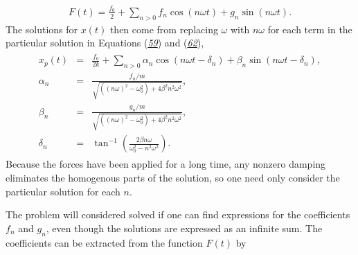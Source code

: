 \documentclass[letterpaper,10pt,english]{sphinxmanual}
\begin{document}
\begin{equation*}
\begin{split}
\begin{equation}
\label{eq:fourierdef1} \tag{82}
F(t)=\frac{f_0}{2}+\sum_{n>0}f_n\cos(n\omega t)+g_n\sin(n\omega t).
\end{equation}
\end{split}
\end{equation*}
The solutions for \(x(t)\) then come from replacing \(\omega\) with
\(n\omega\) for each term in the particular solution in Equations
({\hyperref[\detokenize{chapter1:eq:partform}]{\emph{59}}}) and ({\hyperref[\detokenize{chapter1:eq:Ddrive}]{\emph{62}}}),
\begin{equation*}
\begin{split}
\begin{eqnarray}
x_p(t)&=&\frac{f_0}{2k}+\sum_{n>0} \alpha_n\cos(n\omega t-\delta_n)+\beta_n\sin(n\omega t-\delta_n),\\
\nonumber
\alpha_n&=&\frac{f_n/m}{\sqrt{((n\omega)^2-\omega_0^2)+4\beta^2n^2\omega^2}},\\
\nonumber
\beta_n&=&\frac{g_n/m}{\sqrt{((n\omega)^2-\omega_0^2)+4\beta^2n^2\omega^2}},\\
\nonumber
\delta_n&=&\tan^{-1}\left(\frac{2\beta n\omega}{\omega_0^2-n^2\omega^2}\right).
\end{eqnarray}
\end{split}
\end{equation*}
Because the forces have been applied for a long time, any non\sphinxhyphen{}zero
damping eliminates the homogenous parts of the solution, so one need
only consider the particular solution for each \(n\).

The problem will considered solved if one can find expressions for the
coefficients \(f_n\) and \(g_n\), even though the solutions are expressed
as an infinite sum. The coefficients can be extracted from the
function \(F(t)\) by
\end{document}
